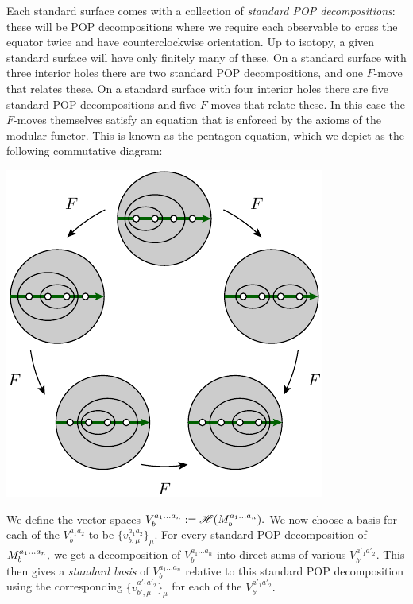 \documentclass[aps, prl, letterpaper, twocolumn, superscriptaddress, notitlepage, 10pt]{revtex4-1}
\begin{document}
Each standard surface comes with a collection of
\emph{standard POP decompositions}:
these will be POP decompositions where we require each
observable to cross the
equator twice and have counterclockwise orientation.
Up to isotopy, a given standard surface will have only finitely many of these.
On a standard surface with three
interior holes there are two standard POP decompositions,
and one $F$-move that relates these.
On a standard surface with four interior holes there are five 
standard POP decompositions and five $F$-moves that relate these.
In this case the $F$-moves themselves satisfy an equation
that is enforced by the axioms of the modular functor.
This is known as the pentagon equation, which we depict as
the following commutative diagram:
\begin{center}
\includegraphics[]{pic-pentagon.pdf}
\end{center}

We define the vector spaces 
$ V^{a_1...a_n}_{b} := \mathscr{H}(M^{a_1...a_n}_{b}).$ 
We now choose a basis for each of the
$V^{a_1a_2}_{b}$ to be $\{v^{a_1a_2}_{b,\mu}\}_{\mu}.$
For every standard POP decomposition of $M^{a_1...a_n}_{b},$
we get a decomposition of 
$V^{a_1...a_n}_{b}$ into direct sums of various %
$V^{a'_1a'_2}_{b'}.$ 
This then gives a \emph{standard basis} of $V^{a_1...a_n}_{b}$
relative to this standard POP decomposition
using the corresponding  $\{v^{a'_1a'_2}_{b',\mu}\}_{\mu}$
for each of the $V^{a'_1a'_2}_{b'}.$ %
\end{document}
